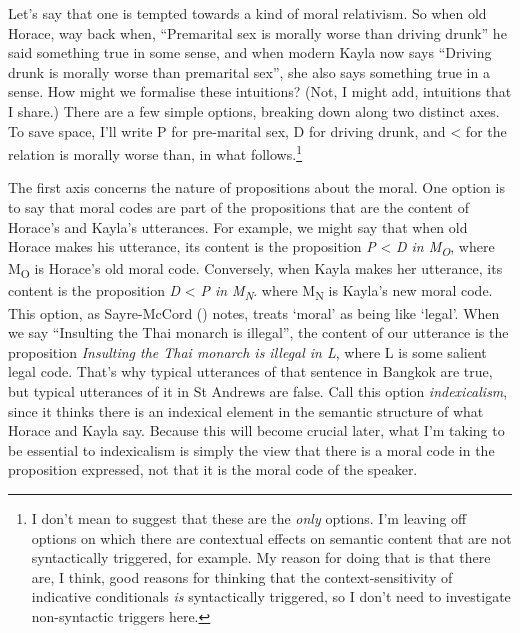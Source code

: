 \documentclass[
  11pt,
  letterpaper,
  DIV=11,
  numbers=noendperiod,
  twoside]{scrartcl}
\begin{document}
Let's say that one is tempted towards a kind of moral relativism. So
when old Horace, way back when, ``Premarital sex is morally worse than
driving drunk'' he said something true in some sense, and when modern
Kayla now says ``Driving drunk is morally worse than premarital sex'',
she also says something true in a sense. How might we formalise these
intuitions? (Not, I might add, intuitions that I share.) There are a few
simple options, breaking down along two distinct axes. To save space,
I'll write P for pre-marital sex, D for driving drunk, and \textless{}
for the relation is morally worse than, in what follows.\footnote{I
  don't mean to suggest that these are the \emph{only} options. I'm
  leaving off options on which there are contextual effects on semantic
  content that are not syntactically triggered, for example. My reason
  for doing that is that there are, I think, good reasons for thinking
  that the context-sensitivity of indicative conditionals \emph{is}
  syntactically triggered, so I don't need to investigate non-syntactic
  triggers here.}

The first axis concerns the nature of propositions about the moral. One
option is to say that moral codes are part of the propositions that are
the content of Horace's and Kayla's utterances. For example, we might
say that when old Horace makes his utterance, its content is the
proposition \emph{P} \textless{} \emph{D in M\textsubscript{O}}, where
M\textsubscript{O} is Horace's old moral code. Conversely, when Kayla
makes her utterance, its content is the proposition \emph{D} \textless{}
\emph{P in M\textsubscript{N}}. where M\textsubscript{N} is Kayla's new
moral code. This option, as Sayre-McCord
() notes, treats `moral' as being
like `legal'. When we say ``Insulting the Thai monarch is illegal'', the
content of our utterance is the proposition \emph{Insulting the Thai
monarch is illegal in L}, where L is some salient legal code. That's why
typical utterances of that sentence in Bangkok are true, but typical
utterances of it in St Andrews are false. Call this option
\emph{indexicalism}, since it thinks there is an indexical element in
the semantic structure of what Horace and Kayla say. Because this will
become crucial later, what I'm taking to be essential to indexicalism is
simply the view that there is a moral code in the proposition expressed,
not that it is the moral code of the speaker.
\end{document}

